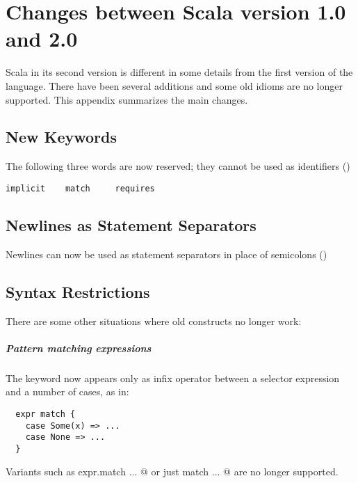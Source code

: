 \chapter{Changes between Scala version 1.0 and 2.0}


Scala in its second version is different in some details from the
first version of the language. There have been several additions and
some old idioms are no longer supported. This appendix summarizes
the main changes.

\section{New Keywords}

The following three words are now reserved; they cannot be used as
identifiers ()
\begin{lstlisting}
implicit    match     requires
\end{lstlisting}

\section{Newlines as Statement Separators}

Newlines can now be used as statement separators in place of
semicolons ()

\section{Syntax Restrictions}

There are some other situations where old constructs no longer work:

\paragraph{\em Pattern matching expressions} The \lstinline@match@
keyword now appears only as infix operator between a selector
expression and a number of cases, as in:
\begin{lstlisting}
  expr match {
    case Some(x) => ...
    case None => ...
  }
\end{lstlisting}
Variants such as \lstinline@ expr.match {...} @ 
or just
\lstinline@ match {...} @
are no longer supported.

